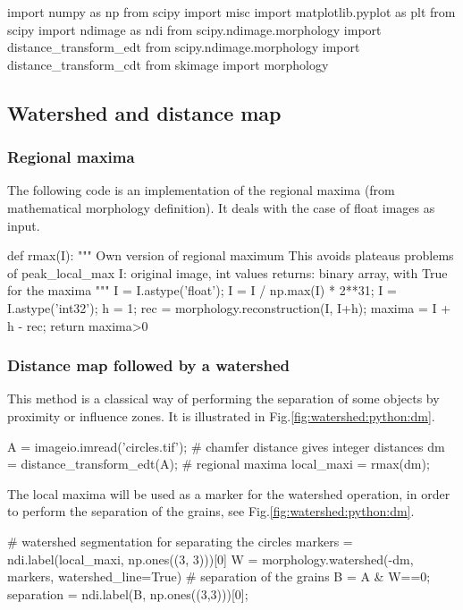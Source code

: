 \def\QRCODE{MASTER_mispa_TUT.IMG.image_segmentation_watershed_pythonqrcode.png}
\def\QRPAGE{http://www.iptutorials.science/tree/master/MASTER_mispa/TUT.IMG.image_segmentation_watershed/python}

\begin{python}
import numpy as np
from scipy import misc
import matplotlib.pyplot as plt
from scipy import ndimage as ndi
from scipy.ndimage.morphology import distance_transform_edt
from scipy.ndimage.morphology import distance_transform_cdt
from skimage import morphology
\end{python}


\vspace*{-8pt}

\subsection{Watershed and distance map}
\subsubsection{Regional maxima}
The following code is an implementation of the regional maxima (from mathematical morphology definition). It deals with the case of float images as input.
\begin{python}
def rmax(I):    
    """
    Own version of regional maximum
    This avoids plateaus problems of peak_local_max
    I: original image, int values
    returns: binary array, with True for the maxima
    """
    I = I.astype('float');
    I = I / np.max(I) * 2**31;
    I = I.astype('int32');
    h = 1;
    rec = morphology.reconstruction(I, I+h);
    maxima = I + h - rec;
    return maxima>0
\end{python}

\subsubsection{Distance map followed by a watershed}
This method is a classical way of performing the separation of some objects by proximity or influence zones. It is illustrated in Fig.\ref{fig:watershed:python:dm}.

\begin{python}
A = imageio.imread('circles.tif');
# chamfer distance gives integer distances
dm = distance_transform_edt(A);
# regional maxima
local_maxi = rmax(dm);
\end{python}
The local maxima will be used as a marker for the watershed operation, in order to perform the separation of the grains, see Fig.\ref{fig:watershed:python:dm}.
\begin{python}
# watershed segmentation for separating the circles
markers = ndi.label(local_maxi, np.ones((3, 3)))[0]
W = morphology.watershed(-dm, markers, watershed_line=True)
# separation of the grains
B = A & W==0;
separation = ndi.label(B, np.ones((3,3)))[0];
\end{python}

